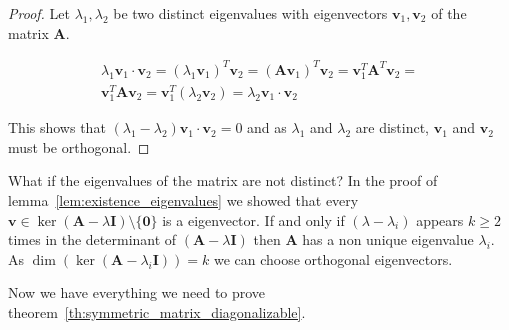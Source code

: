 \documentclass[a4paper]{IEEEtran}
\begin{document}
\begin{proof}
	Let $\lambda_1, \lambda_2$ be two distinct eigenvalues with eigenvectors $\mathbf{v}_1, \mathbf{v}_2$ of the matrix $\mathbf{A}$.
	
	\begin{align*}
		\lambda_1 \mathbf{v}_1 \cdot \mathbf{v}_2 = (\lambda_1\mathbf{v}_1)^T \mathbf{v}_2 = (\mathbf{Av}_1)^T \mathbf{v}_2 = \mathbf{v}_1^T \mathbf{A}^T \mathbf{v}_2 =\\
		\mathbf{v}_1^T \mathbf{A} \mathbf{v}_2 = \mathbf{v}_1^T (\lambda_2 \mathbf{v}_2) = \lambda_2 \mathbf{v}_1 \cdot \mathbf{v}_2
	\end{align*}
	
	This shows that $(\lambda_1 - \lambda_2) \mathbf{v}_1 \cdot \mathbf{v}_2 = 0$ and as $\lambda_1$ and $\lambda_2$ are distinct, $\mathbf{v}_1$ and $\mathbf{v}_2$ must be orthogonal.
\end{proof}

What if the eigenvalues of the matrix are not distinct? In the proof of lemma~\ref{lem:existence_eigenvalues} we showed that every $\mathbf{v} \in \ker(\mathbf{A} - \lambda\mathbf{I}) \setminus \{\mathbf{0}\}$ is a eigenvector. If and only if $(\lambda - \lambda_i)$ appears $k \geq 2$ times in the determinant of $(\mathbf{A} - \lambda\mathbf{I})$ then $\mathbf{A}$ has a non unique eigenvalue $\lambda_i$. As $\dim(\ker(\mathbf{A} - \lambda_i\mathbf{I})) = k$ we can choose orthogonal eigenvectors. 


Now we have everything we need to prove theorem~\ref{th:symmetric_matrix_diagonalizable}. 
\end{document}
